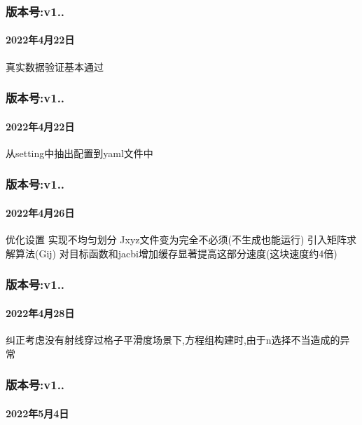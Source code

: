 \subsubsection*{版本号\+:v1..}

\paragraph*{2022年4月22日}

真实数据验证基本通过

\subsubsection*{版本号\+:v1..}

\paragraph*{2022年4月22日}

从setting中抽出配置到yaml文件中

\subsubsection*{版本号\+:v1..}

\paragraph*{2022年4月26日}

优化设置 实现不均匀划分 Jxyz文件变为完全不必须(不生成也能运行) 引入矩阵求解算法(\+Gij) 对目标函数和jacbi增加缓存显著提高这部分速度(这块速度约4倍)

\subsubsection*{版本号\+:v1..}

\paragraph*{2022年4月28日}

纠正考虑没有射线穿过格子平滑度场景下,方程组构建时,由于n选择不当造成的异常

\subsubsection*{版本号\+:v1..}

\paragraph*{2022年5月4日}

